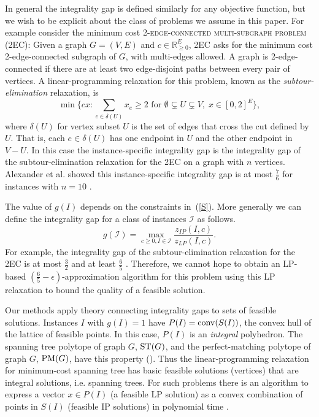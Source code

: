 In general the integrality gap is defined similarly for any objective function, but we wish to be explicit about the class of problems we assume in this paper. For example consider the minimum cost \textsc{2-edge-connected multi-subgraph problem (2EC)}: Given a graph $G=(V,E)$ and $c\in \mathbb{R}^E_{\geq 0}$, 2EC asks for the minimum cost 2-edge-connected subgraph of $G$, with multi-edges allowed. A graph is 2-edge-connected if there are at least two edge-disjoint paths between every pair of vertices.  A linear-programming relaxation for this problem, known as the {\em subtour-elimination} relaxation, is
 \begin{equation}\min \{cx: \sum_{e\in \delta(U)}x_e \geq 2 \mbox{ for } \emptyset \subsetneq U \subsetneq V,\; x\in [0,2]^{E}\}, 
 \label{eq:subtour}
 \end{equation}
where $\delta(U)$ for vertex subset $U$ is the set of edges that cross the cut defined by $U$.  That is, each $e \in \delta(U)$ has one endpoint in $U$ and the other endpoint in $V-U$.
 In this case the instance-specific integrality gap is the integrality gap of the subtour-elimination relaxation for the 2EC on a graph with $n$ vertices. Alexander et al. \cite{alexander2006integrality} showed this instance-specific integrality gap
is at most $\frac{7}{6}$ for instances with $n= 10$ .

The value of $g(I)$ depends on the constraints in~(\ref{S}). More generally we can define the integrality gap for a class of instances $\mathcal{I}$ as follows.%
\begin{equation}\label{gapproblem}
g(\mathcal{I}) = \max_{c\geq 0 , I\in\mathcal{I}}\frac{z_{IP}(I,c)}{z_{LP}(I,c)}.
\end{equation}
For example, the integrality gap of the subtour-elimination relaxation for the 2EC is at most $\frac{3}{2}$ \cite{wolsey} and at least $\frac{6}{5}$ \cite{alexander2006integrality}. Therefore, we cannot hope to obtain an LP-based $(\frac{6}{5}-\epsilon)$-approximation algorithm for this problem using this LP relaxation to bound the quality of a feasible solution.

Our methods apply theory connecting integrality gaps to sets of feasible solutions. Instances $I$ with $g(I)=1$ have $P(I)=\operatorname{conv}(S(I))$, the convex hull of the lattice of feasible points. In this case, $P(I)$ is an \textit{integral} polyhedron. The spanning tree polytope of graph $G$, $\operatorname{ST}(G)$, and the perfect-matching polytope of graph $G$, $\operatorname{{{PM}}}(G)$, have this property (\cite{Edmonds2003,edmondsPM}). Thus the linear-programming relaxation for minimum-cost spanning tree has basic feasible solutions (vertices) that are integral solutions, i.e. spanning trees. For such problems there is an algorithm to express a vector $x\in P(I)$ (a feasible LP solution) as a convex combination of points in $S(I)$ (feasible IP solutions) in polynomial time \cite{cons-cara}.

